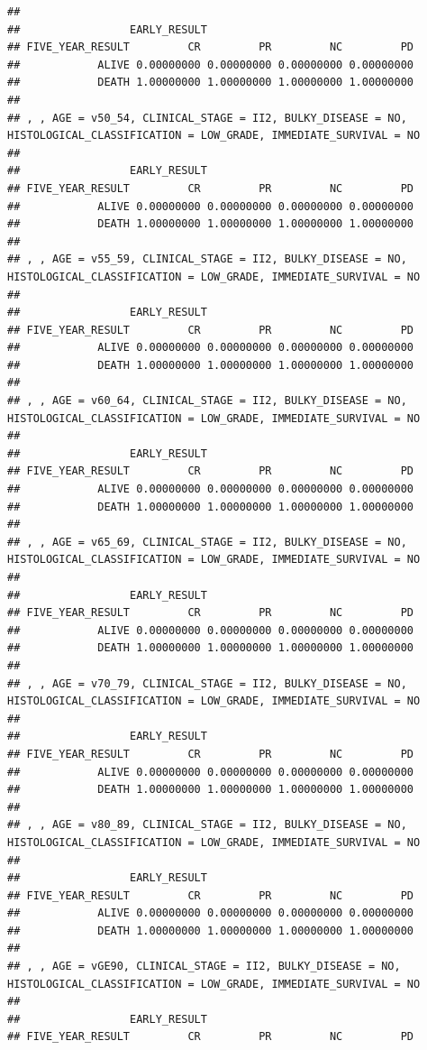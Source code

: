 \documentclass[]{article}
\begin{document}
\begin{verbatim}
## 
##                 EARLY_RESULT
## FIVE_YEAR_RESULT         CR         PR         NC         PD
##            ALIVE 0.00000000 0.00000000 0.00000000 0.00000000
##            DEATH 1.00000000 1.00000000 1.00000000 1.00000000
## 
## , , AGE = v50_54, CLINICAL_STAGE = II2, BULKY_DISEASE = NO, HISTOLOGICAL_CLASSIFICATION = LOW_GRADE, IMMEDIATE_SURVIVAL = NO
## 
##                 EARLY_RESULT
## FIVE_YEAR_RESULT         CR         PR         NC         PD
##            ALIVE 0.00000000 0.00000000 0.00000000 0.00000000
##            DEATH 1.00000000 1.00000000 1.00000000 1.00000000
## 
## , , AGE = v55_59, CLINICAL_STAGE = II2, BULKY_DISEASE = NO, HISTOLOGICAL_CLASSIFICATION = LOW_GRADE, IMMEDIATE_SURVIVAL = NO
## 
##                 EARLY_RESULT
## FIVE_YEAR_RESULT         CR         PR         NC         PD
##            ALIVE 0.00000000 0.00000000 0.00000000 0.00000000
##            DEATH 1.00000000 1.00000000 1.00000000 1.00000000
## 
## , , AGE = v60_64, CLINICAL_STAGE = II2, BULKY_DISEASE = NO, HISTOLOGICAL_CLASSIFICATION = LOW_GRADE, IMMEDIATE_SURVIVAL = NO
## 
##                 EARLY_RESULT
## FIVE_YEAR_RESULT         CR         PR         NC         PD
##            ALIVE 0.00000000 0.00000000 0.00000000 0.00000000
##            DEATH 1.00000000 1.00000000 1.00000000 1.00000000
## 
## , , AGE = v65_69, CLINICAL_STAGE = II2, BULKY_DISEASE = NO, HISTOLOGICAL_CLASSIFICATION = LOW_GRADE, IMMEDIATE_SURVIVAL = NO
## 
##                 EARLY_RESULT
## FIVE_YEAR_RESULT         CR         PR         NC         PD
##            ALIVE 0.00000000 0.00000000 0.00000000 0.00000000
##            DEATH 1.00000000 1.00000000 1.00000000 1.00000000
## 
## , , AGE = v70_79, CLINICAL_STAGE = II2, BULKY_DISEASE = NO, HISTOLOGICAL_CLASSIFICATION = LOW_GRADE, IMMEDIATE_SURVIVAL = NO
## 
##                 EARLY_RESULT
## FIVE_YEAR_RESULT         CR         PR         NC         PD
##            ALIVE 0.00000000 0.00000000 0.00000000 0.00000000
##            DEATH 1.00000000 1.00000000 1.00000000 1.00000000
## 
## , , AGE = v80_89, CLINICAL_STAGE = II2, BULKY_DISEASE = NO, HISTOLOGICAL_CLASSIFICATION = LOW_GRADE, IMMEDIATE_SURVIVAL = NO
## 
##                 EARLY_RESULT
## FIVE_YEAR_RESULT         CR         PR         NC         PD
##            ALIVE 0.00000000 0.00000000 0.00000000 0.00000000
##            DEATH 1.00000000 1.00000000 1.00000000 1.00000000
## 
## , , AGE = vGE90, CLINICAL_STAGE = II2, BULKY_DISEASE = NO, HISTOLOGICAL_CLASSIFICATION = LOW_GRADE, IMMEDIATE_SURVIVAL = NO
## 
##                 EARLY_RESULT
## FIVE_YEAR_RESULT         CR         PR         NC         PD

\end{verbatim}
\end{document}
